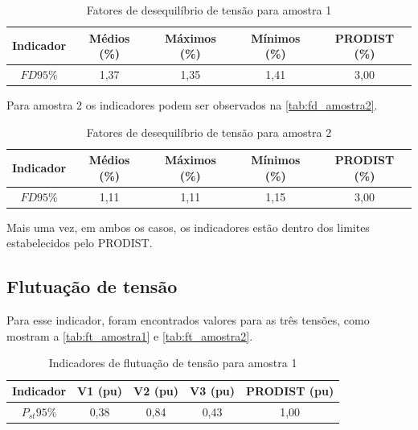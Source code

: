 \begin{table}[H]
  \centering
  \caption{Fatores de desequilíbrio de tensão para amostra 1}
  \label{tab:fd_amostra1}
  \begin{tabular}{@{}ccccc@{}}
    \toprule
   \textbf{Indicador} & \textbf{Médios (\%)} & \textbf{Máximos (\%)} & \textbf{Mínimos (\%)} & \textbf{PRODIST (\%)} \\
    \midrule
    $FD95\%$  & 1,37 & 1,35 & 1,41 & 3,00 \\
    \bottomrule
  \end{tabular}
\end{table}

Para amostra 2 os indicadores podem ser observados na \autoref{tab:fd_amostra2}.

\begin{table}[H]
  \centering
  \caption{Fatores de desequilíbrio de tensão para amostra 2}
  \label{tab:fd_amostra2}
  \begin{tabular}{@{}ccccc@{}}
    \toprule
   \textbf{Indicador} & \textbf{Médios (\%)} & \textbf{Máximos (\%)} & \textbf{Mínimos (\%)} & \textbf{PRODIST (\%)} \\
    \midrule
    $FD95\%$  & 1,11 & 1,11 & 1,15 & 3,00 \\
    \bottomrule
  \end{tabular}
\end{table}

Mais uma vez, em ambos os casos, os indicadores estão dentro dos limites estabelecidos pelo PRODIST.

\subsection{Flutuação de tensão}

Para esse indicador, foram encontrados valores para as três tensões, como mostram a \autoref{tab:ft_amostra1} e \autoref{tab:ft_amostra2}.

\begin{table}[H]
  \centering
  \caption{Indicadores de flutuação de tensão para amostra 1}
  \label{tab:ft_amostra1}
  \begin{tabular}{@{}ccccc@{}}
    \toprule
    Indicador & V1 (pu) & V2 (pu) & V3 (pu) & PRODIST  (pu) \\
    \midrule
    $P_{st}95\%$   & 0,38 & 0,84 & 0,43 & 1,00 \\
    \bottomrule
  \end{tabular}
\end{table}

